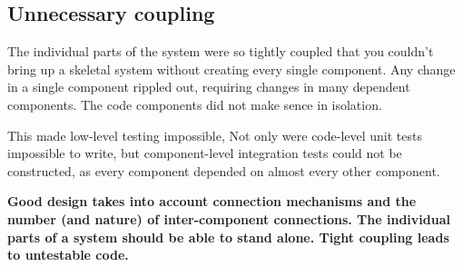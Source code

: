 \documentclass[a4paper]{article}
\begin{document}
\subsection{Unnecessary coupling}
\par The individual parts of the system were so tightly coupled that you couldn't bring up a skeletal system without creating every single component. 
Any change in a single component rippled out, requiring changes in many dependent components. 
The code components did not make sence in isolation.
\par This made low-level testing impossible, Not only were code-level unit tests impossible to write, but component-level integration tests could not be constructed, as every component depended on almost every other component. 

\textbf{
    Good design takes into account connection mechanisms and the number (and nature) of inter-component connections. 
    The individual parts of a system should be able to stand alone.
    Tight coupling leads to untestable code.
}
\end{document}
